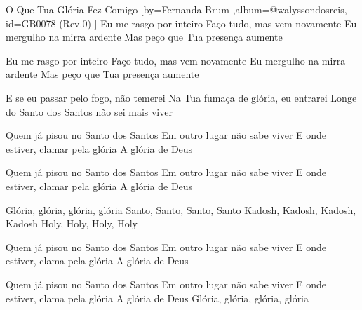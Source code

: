 \beginsong
{O Que Tua Glória Fez Comigo %
}[by={Fernanda Brum %
},album={@walyssondosreis},
id={GB0078 %
(Rev.0) %
}]
Eu me rasgo por inteiro
Faço tudo, mas vem novamente
Eu mergulho na mirra ardente
Mas peço que Tua presença aumente

Eu me rasgo por inteiro
Faço tudo, mas vem novamente
Eu mergulho na mirra ardente
Mas peço que Tua presença aumente

E se eu passar pelo fogo, não temerei
Na Tua fumaça de glória, eu entrarei
Longe do Santo dos Santos não sei mais viver

Quem já pisou no Santo dos Santos
Em outro lugar não sabe viver
E onde estiver, clamar pela glória
A glória de Deus

Quem já pisou no Santo dos Santos
Em outro lugar não sabe viver
E onde estiver, clamar pela glória
A glória de Deus

Glória, glória, glória, glória
Santo, Santo, Santo, Santo
Kadosh, Kadosh, Kadosh, Kadosh
Holy, Holy, Holy, Holy

Quem já pisou no Santo dos Santos
Em outro lugar não sabe viver
E onde estiver, clama pela glória
A glória de Deus

Quem já pisou no Santo dos Santos
Em outro lugar não sabe viver
E onde estiver, clama pela glória
A glória de Deus
Glória, glória, glória, glória


